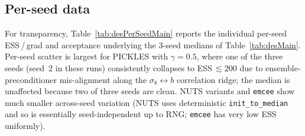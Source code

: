 \documentclass{article}
\begin{document}
\subsection{Per-seed data}\label{ssec:desPerSeed}

For transparency, Table~\ref{tab:desPerSeedMain} reports the individual
per-seed ESS\,/\,grad and acceptance underlying the
$3$-seed medians of Table~\ref{tab:desMain}.  Per-seed scatter is
largest for PICKLES with $\gamma=0.5$, where one of the three seeds
(seed~$2$ in these runs) consistently collapses to ESS\,$\lesssim 200$
due to ensemble-preconditioner mis-alignment along the
$\sigma_8\!\leftrightarrow\!b$ correlation ridge; the median is
unaffected because two of three seeds are clean.  NUTS variants and
\texttt{emcee} show much smaller across-seed variation (NUTS uses
deterministic \texttt{init\_to\_median} and so is essentially
seed-independent up to RNG; \texttt{emcee} has very low ESS uniformly).
\end{document}
